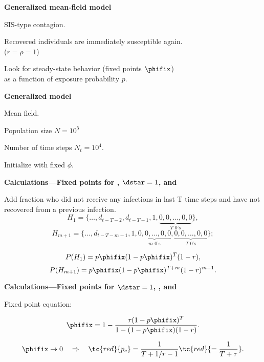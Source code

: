 


  \textbf{Generalized mean-field model}

  SIS-type contagion.

  Recovered individuals are immediately susceptible again.\\
  ($r=\rho=1$)
  
  Look for steady-state behavior (fixed points $\phifix$)\\
  as a function of exposure probability $p$.




  \textbf{Generalized model}


  Mean field.

  Population size $N = 10^5$

  Number of time steps $N_t = 10^4$.

  Initialize with fixed $\phi$.


  \textbf{Calculations---Fixed points for , $\dstar=1$, and }

  Add fraction who did not receive any infections in last T time steps
  and have not recovered from a previous infection.
  $$H_1 = \{ \ldots, d_{t-T-2}, d_{t-T-1}, 1, \underbrace{0, 0, \ldots, 0, 0}_{\mbox{$T$ 0's}} \},$$
  $$H_{m+1} = \{ \ldots, d_{t-T-m-1}, 1, \underbrace{0, 0, \ldots, 0, 0}_{\mbox{$m$ 0's}}, \underbrace{0, 0, \ldots, 0, 0}_{\mbox{$T$ 0's}} \};$$

  $$P(H_1) = p\phifix (1 -p\phifix)^T (1-r), $$
  $$P(H_{m+1}) = p\phifix (1 -p\phifix)^{T+m} (1-r)^{m+1}. $$


  \textbf{Calculations---Fixed points for $\dstar=1$, , and }

  Fixed point equation:

  $$
  \phifix =
 1 - \frac{r (1-p\phifix)^T }
    {1 - (1-p\phifix)(1-r)}.
  $$

  $$
  \phifix \rightarrow 0
  \quad \Rightarrow \quad 
  \tc{red}{p_c} = \frac{1}{T + 1/r - 1} \tc{red}{= \frac{1}{T + \tau}}.
  $$

